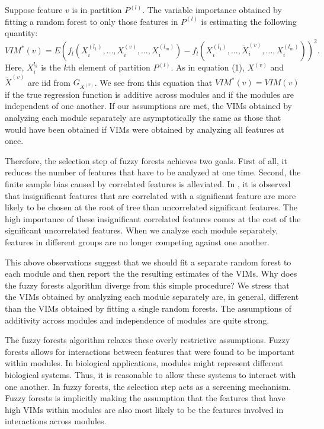 \documentclass[article,shortnames]{jss}
\begin{document}
Suppose feature $v$ is in partition $P^{(l)}$.  The variable importance obtained by fitting a random forest to only those features in  $P^{(l)}$
 is estimating the following quantity: 
 \begin{equation}
 VIM^{*}(v)=E(f_{l}(X^{(l_{1})}_{i},\ldots,X^{(v)}_{i},\ldots,X^{(l_{m})}_{i}) - f_{l}(X^{(l_{1})}_{i},\ldots,\tilde{X}^{(v)}_{i},\ldots,X^{(l_{m})}_{i}))^{2}.
 \end{equation}
 Here, $X_{i}^{l_{k}}$ is the $k$th element of partition $P^{(l)}$. As in equation (1), $X^{(v)}$ and $\tilde{X}^{(v)}$ are iid from $G_{X^{(v)}}$.
 We see from this equation that $VIM^{*}(v)=VIM(v)$ if the true regression function is additive across modules and if the modules are independent
 of one another.  If our assumptions are met, the VIMs obtained by analyzing each module separately are asymptotically the same as those that 
would have been obtained if VIMs were obtained by analyzing all features at once.       

Therefore, the selection step of fuzzy forests achieves two goals.  First of all, it reduces the number of features that have to be 
analyzed at one time.  Second, the finite sample bias caused by correlated features is alleviated.  In 
\citep{nicodemus2009predictor}, it is observed that insignificant features that are correlated with a significant feature 
are more likely to be chosen at the root of tree than uncorrelated significant features.  The high importance of these insignificant
correlated features comes at the cost of the significant uncorrelated features.  When we analyze each module separately, features 
in different groups are no longer competing against one another.   

This above observations suggest that we should fit a separate random forest to each module and then report the the resulting
estimates of the VIMs.  Why does the fuzzy forests algorithm diverge from this simple procedure?
We stress that the VIMs obtained by analyzing each module separately are, in general, different than the VIMs obtained
by fitting a single random forests.  The assumptions of additivity across modules and independence of modules are quite strong.

The fuzzy forests algorithm relaxes these overly restrictive assumptions.  Fuzzy forests allows for interactions between features that
were found to be important within modules.  In biological applications, modules might represent different biological systems.
Thus, it is reasonable to allow these systems to interact with one another.  In fuzzy forests, the selection step acts as a screening mechanism.
Fuzzy forests is implicitly making the assumption that the features that have high VIMs within modules are also most likely to be the features
involved in interactions across modules.   
\end{document}
